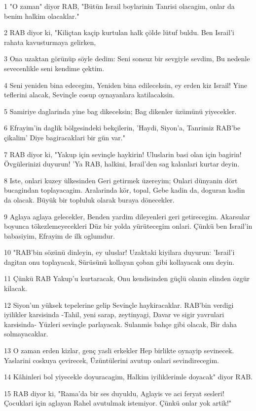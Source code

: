 \par 1 "O zaman" diyor RAB, "Bütün Israil boylarinin Tanrisi olacagim, onlar da benim halkim olacaklar."
\par 2 RAB diyor ki, "Kiliçtan kaçip kurtulan halk çölde lütuf buldu. Ben Israil'i rahata kavusturmaya gelirken,
\par 3 Ona uzaktan görünüp söyle dedim: Seni sonsuz bir sevgiyle sevdim, Bu nedenle sevecenlikle seni kendime çektim.
\par 4 Seni yeniden bina edecegim, Yeniden bina edileceksin, ey erden kiz Israil! Yine teflerini alacak, Sevinçle cosup oynayanlara katilacaksin.
\par 5 Samiriye daglarinda yine bag dikeceksin; Bag dikenler üzümünü yiyecekler.
\par 6 Efrayim'in daglik bölgesindeki bekçilerin, 'Haydi, Siyon'a, Tanrimiz RAB'be çikalim' Diye bagiracaklari bir gün var."
\par 7 RAB diyor ki, "Yakup için sevinçle haykirin! Uluslarin basi olan için bagirin! Övgülerinizi duyurun! 'Ya RAB, halkini, Israil'den sag kalanlari kurtar deyin.
\par 8 Iste, onlari kuzey ülkesinden Geri getirmek üzereyim; Onlari dünyanin dört bucagindan toplayacagim. Aralarinda kör, topal, Gebe kadin da, doguran kadin da olacak. Büyük bir topluluk olarak buraya dönecekler.
\par 9 Aglaya aglaya gelecekler, Benden yardim dileyenleri geri getirecegim. Akarsular boyunca tökezlemeyecekleri Düz bir yolda yürütecegim onlari. Çünkü ben Israil'in babasiyim, Efrayim de ilk oglumdur.
\par 10 "RAB'bin sözünü dinleyin, ey uluslar! Uzaktaki kiyilara duyurun: 'Israil'i dagitan onu toplayacak, Sürüsünü kollayan çoban gibi kollayacak onu deyin.
\par 11 Çünkü RAB Yakup'u kurtaracak, Onu kendisinden güçlü olanin elinden özgür kilacak.
\par 12 Siyon'un yüksek tepelerine gelip Sevinçle haykiracaklar. RAB'bin verdigi iyilikler karsisinda -Tahil, yeni sarap, zeytinyagi, Davar ve sigir yavrulari karsisinda- Yüzleri sevinçle parlayacak. Sulanmis bahçe gibi olacak, Bir daha solmayacaklar.
\par 13 O zaman erden kizlar, genç yasli erkekler Hep birlikte oynayip sevinecek. Yaslarini coskuya çevirecek, Üzüntülerini avutup onlari sevindirecegim.
\par 14 Kâhinleri bol yiyecekle doyuracagim, Halkim iyiliklerimle doyacak" diyor RAB.
\par 15 RAB diyor ki, "Rama'da bir ses duyuldu, Aglayis ve aci feryat sesleri! Çocuklari için aglayan Rahel avutulmak istemiyor. Çünkü onlar yok artik!"
